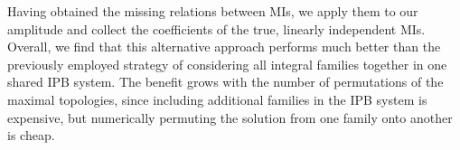 \documentclass[main.tex]{subfiles}
\begin{document}
Having obtained the missing relations between MIs, we apply them to our amplitude and collect the coefficients of the true, linearly independent MIs. Overall, we find that this alternative approach performs much better than the previously employed strategy of considering all integral families together in one shared IPB system. The benefit grows with the number of permutations of the maximal topologies, since including additional families in the IPB system is expensive, but numerically permuting the solution from one family onto another is cheap.
\end{document}
